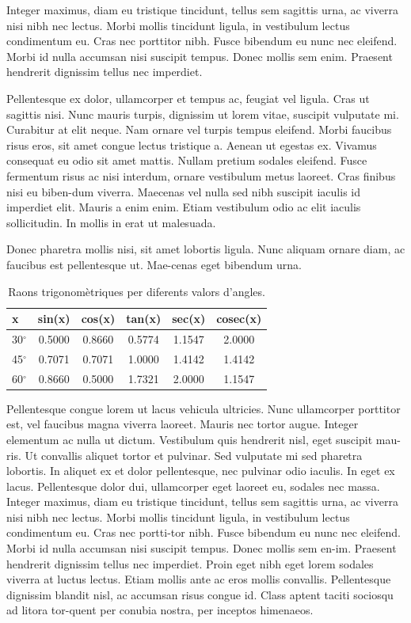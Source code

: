 ﻿\documentclass[10pt,a4paper,twocolumn,twoside]{article}
\begin{document}
Integer maximus, diam eu tristique tincidunt, tellus sem sagittis urna, ac viverra nisi nibh nec lectus. Morbi mollis tincidunt ligula, in vestibulum lectus condimentum eu. Cras nec porttitor nibh. Fusce bibendum eu nunc nec eleifend. Morbi id nulla accumsan nisi suscipit tempus. Donec mollis sem enim. Praesent hendrerit dignissim tellus nec imperdiet. 

Pellentesque ex dolor, ullamcorper et tempus ac, feugiat vel ligula. Cras ut sagittis nisi. Nunc mauris turpis, dignissim ut lorem vitae, suscipit vulputate mi. Curabitur at elit neque. Nam ornare vel turpis tempus eleifend. Morbi faucibus risus eros, sit amet congue lectus tristique a. Aenean ut egestas ex. Vivamus consequat eu odio sit amet mattis. Nullam pretium sodales eleifend. Fusce fermentum risus ac nisi interdum, ornare vestibulum metus laoreet. Cras finibus nisi eu biben-dum viverra. Maecenas vel nulla sed nibh suscipit iaculis id imperdiet elit. Mauris a enim enim. Etiam vestibulum odio ac elit iaculis sollicitudin. In mollis in erat ut malesuada. 

Donec pharetra mollis nisi, sit amet lobortis ligula. Nunc aliquam ornare diam, ac faucibus est pellentesque ut. Mae-cenas eget bibendum urna. 

\begin{table}[!h]
\centering
\begin{tabular}{lccccc}
 x & sin(x) &	cos(x)& tan(x) &  sec(x) & cosec(x)\\
\hline
30$^\circ$ & 0.5000 & 0.8660 & 0.5774 & 1.1547 & 2.0000\\
45$^\circ$ & 0.7071 & 0.7071 & 1.0000 & 1.4142 & 1.4142\\
60$^\circ$ & 0.8660 & 0.5000 & 1.7321 & 2.0000 & 1.1547\\
\hline
\end{tabular}
\caption{ Raons trigonomètriques per diferents valors d’angles.}
\label{t:raonstrigonometriques}
\end{table}

Pellentesque congue lorem ut lacus vehicula ultricies. Nunc ullamcorper porttitor est, vel faucibus magna viverra laoreet. Mauris nec tortor augue. Integer elementum ac nulla ut dictum. Vestibulum quis hendrerit nisl, eget suscipit mau-ris. Ut convallis aliquet tortor et pulvinar. Sed vulputate mi sed pharetra lobortis. In aliquet ex et dolor pellentesque, nec pulvinar odio iaculis. In eget ex lacus. Pellentesque dolor dui, ullamcorper eget laoreet eu, sodales nec massa. Integer maximus, diam eu tristique tincidunt, tellus sem sagittis urna, ac viverra nisi nibh nec lectus. Morbi mollis tincidunt ligula, in vestibulum lectus condimentum eu. Cras nec portti-tor nibh. Fusce bibendum eu nunc nec eleifend. Morbi id nulla accumsan nisi suscipit tempus. Donec mollis sem en-im. Praesent hendrerit dignissim tellus nec imperdiet. Proin eget nibh eget lorem sodales viverra at luctus lectus. Etiam mollis ante ac eros mollis convallis. Pellentesque dignissim blandit nisl, ac accumsan risus congue id. Class aptent taciti sociosqu ad litora tor-quent per conubia nostra, per inceptos himenaeos. 
\end{document}
